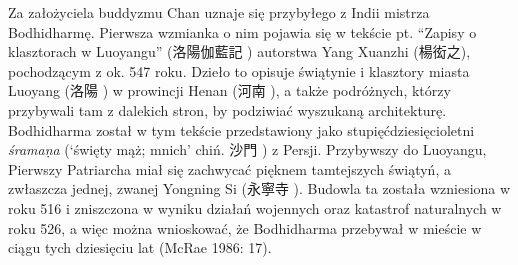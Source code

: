 Za założyciela buddyzmu Chan uznaje się przybyłego z Indii mistrza Bodhidharmę.
Pierwsza wzmianka o nim pojawia się w tekście pt. ``Zapisy o klasztorach w Luoyangu'' (洛陽伽藍記 ) autorstwa Yang Xuanzhi (楊衒之), pochodzącym z ok. 547 roku.
Dzieło to opisuje świątynie i klasztory miasta Luoyang (洛陽 ) w prowincji Henan (河南 ), a także podróżnych, którzy przybywali tam z dalekich stron, by podziwiać wyszukaną architekturę.
Bodhidharma został w tym tekście przedstawiony jako stupięćdziesięcioletni \textit{śrama\d{n}a} (`święty mąż; mnich' chiń. 沙門 ) z Persji.
Przybywszy do Luoyangu, Pierwszy Patriarcha miał się zachwycać pięknem tamtejszych świątyń, a zwłaszcza jednej, zwanej Yongning Si (永寧寺 ).
Budowla ta została wzniesiona w roku 516 i zniszczona w wyniku działań wojennych oraz katastrof naturalnych w roku 526, a więc można wnioskować, że Bodhidharma przebywał w mieście w ciągu tych dziesięciu lat
(McRae 1986: 17).

